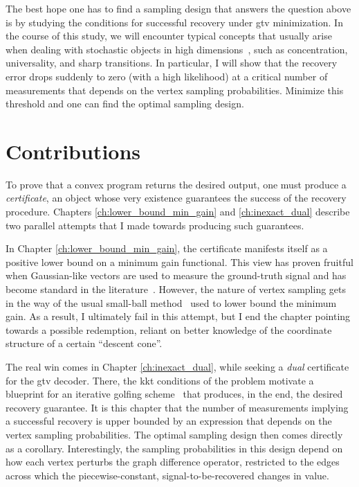 \begin{center}
\end{center}

The best hope one has to find a sampling design that answers the question above is by studying the conditions for successful recovery under \acrshort{gtv} minimization. In the course of this study, we will encounter typical concepts that usually arise when dealing with stochastic objects in high dimensions~\cite[Ch. 1]{vanhandel2014}, such as concentration, universality, and sharp transitions. In particular, I will show that the recovery error drops suddenly to zero (with a high likelihood) at a critical number of measurements that depends on the vertex sampling probabilities. Minimize this threshold and one can find the optimal sampling design.

\section{Contributions}

To prove that a convex program returns the desired output, one must produce a \emph{certificate}, an object whose very existence guarantees the success of the recovery procedure. Chapters \ref{ch:lower_bound_min_gain} and \ref{ch:inexact_dual} describe two parallel attempts that I made towards producing such guarantees.

In Chapter \ref{ch:lower_bound_min_gain}, the certificate manifests itself as a positive lower bound on a minimum gain functional. This view has proven fruitful when Gaussian-like vectors are used to measure the ground-truth signal and has become standard in the literature~\cite{chandrasekaran2012, tropp2015a}. However, the nature of vertex sampling gets in the way of the usual small-ball method~\cite{mendelson2015, koltchinskii2015} used to lower bound the minimum gain. As a result, I ultimately fail in this attempt, but I end the chapter pointing towards a possible redemption, reliant on better knowledge of the coordinate structure of a certain ``descent cone''.

The real win comes in Chapter \ref{ch:inexact_dual}, while seeking a \emph{dual} certificate for the \acrshort{gtv} decoder. There, the \acrlong{kkt} conditions of the problem motivate a blueprint for an iterative golfing scheme~\cite{gross2011} that produces, in the end, the desired recovery guarantee. It is this chapter that the number of measurements implying a successful recovery is upper bounded by an expression that depends on the vertex sampling probabilities. The optimal sampling design then comes directly as a corollary. Interestingly, the sampling probabilities in this design depend on how each vertex perturbs the graph difference operator, restricted to the edges across which the piecewise-constant, signal-to-be-recovered changes in value.

